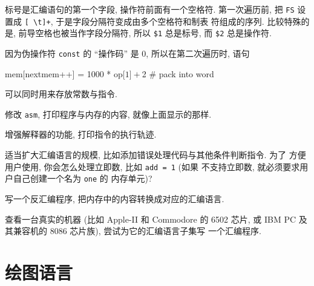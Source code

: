 标号是汇编语句的第一个字段, 操作符前面有一个空格符. 第一次遍历前, 把
\texttt{FS} 设置成 \verb'[ \t]+', 于是字段分隔符变成由多个空格符和制表
符组成的序列. 比较特殊的是, 前导空格也被当作字段分隔符, 所以 \verb'$1'
总是标号, 而 \verb'$2' 总是操作符.

因为伪操作符 \texttt{const} 的 ``操作码'' 是 0, 所以在第二次遍历时, 语句
\begin{awkcode}
    mem[nextmem++] = 1000 * op[$1] + $2  # pack into word
\end{awkcode}
可以同时用来存放常数与指令.

\begin{exercise}
    \label{exer:asm}
    修改 \texttt{asm}, 打印程序与内存的内容, 就像上面显示的那样.
\end{exercise}

\begin{exercise}
    增强解释器的功能, 打印指令的执行轨迹.
\end{exercise}

\begin{exercise}
    适当扩大汇编语言的规模, 比如添加错误处理代码与其他条件判断指令. 为了 
    方便用户使用, 你会怎么处理立即数, 比如 \texttt{add = 1} (如果 
    不支持立即数, 就必须要求用户自己创建一个名为 \texttt{one} 的
    内存单元)?
\end{exercise}

\begin{exercise}
    写一个反汇编程序, 把内存中的内容转换成对应的汇编语言.
\end{exercise}

\begin{exercise}
    查看一台真实的机器 (比如 Apple-II 和 Commodore 的 6502 芯片, 或
    IBM PC 及其兼容机的 8086 芯片族), 尝试为它的汇编语言子集写
    一个汇编程序.
\end{exercise}

\section{绘图语言}
\label{sec:a_language_for_drawing_graphs}

